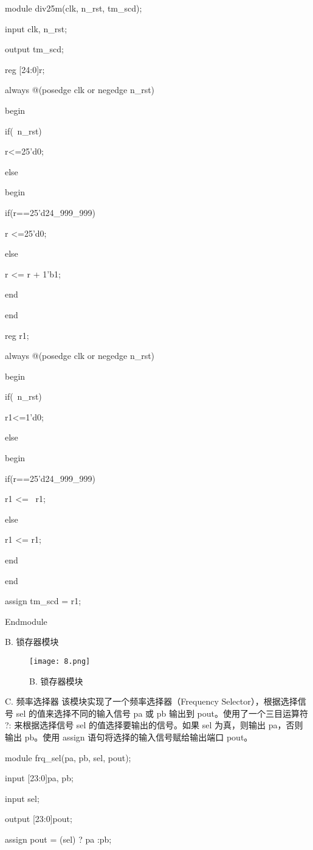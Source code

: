 \documentclass[AutoFakeBold]{LZUThesis}
\begin{document}
module div25m(clk, n\_rst, tm\_scd);

input clk, n\_rst;

output tm\_scd;

reg [24:0]r;

always @(posedge clk or negedge n\_rst)

begin

	if(~n\_rst)

		r<=25'd0;

	else

	begin

		if(r==25'd24\_999\_999)

			r <=25'd0;

		else

			r <= r + 1'b1;

	end	

end

reg r1;

always @(posedge clk or negedge n\_rst)

begin

	if(~n\_rst)

		r1<=1'd0;

	else

	begin

		if(r==25'd24\_999\_999)

			r1 <= ~r1;

		else

			r1 <= r1;

	end	

end

assign tm\_scd = r1;

Endmodule

B. 锁存器模块
\begin{figure}[htbp]
    \centering
    \texttt{[image: 8.png]}
    \caption{B. 锁存器模块}
\end{figure}

C. 频率选择器
该模块实现了一个频率选择器（Frequency Selector），根据选择信号 sel 的值来选择不同的输入信号 pa 或 pb 输出到 pout。使用了一个三目运算符 ?: 来根据选择信号 sel 的值选择要输出的信号。如果 sel 为真，则输出 pa，否则输出 pb。使用 assign 语句将选择的输入信号赋给输出端口 pout。

module frq\_sel(pa, pb, sel, pout);

input [23:0]pa, pb;

input sel;

output [23:0]pout;

assign pout = (sel) ?  pa :pb;
\end{document}
